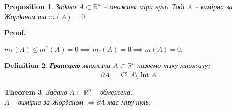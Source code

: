 \documentclass[a4paper, 10pt]{article}
\makeatletter
\def\qed{$\blacksquare$}
\theoremstyle{theoremdd}
\newtheorem{theorem}{Theorem}[subsection]
\theoremstyle{theoremdd}
\newtheorem{definition}[theorem]{Definition}
\theoremstyle{theoremdd}
\theoremstyle{theoremdd}
\theoremstyle{theoremdd}
\theoremstyle{theoremdd}
\theoremstyle{theoremdd}
\theoremstyle{theoremdd}
\theoremstyle{theoremdd}
\newtheorem{proposition}[theorem]{Proposition}
\theoremstyle{theoremdd}
\theoremstyle{theoremdd}
\theoremstyle{theoremdd}
\theoremstyle{theoremdd}
\theoremstyle{theoremdd}
\theoremstyle{theoremdd}
\renewenvironment{proof}[1][Proof.\\]{\par
\pushQED{\hfill \qed}%
\normalfont \topsep6\p@\@plus6\p@\relax
\trivlist
\item\relax
{\bfseries
#1\@addpunct{.}}\hspace\labelsep\ignorespaces
}{%
\popQED\endtrivlist\@endpefalse
}
\DeclareMathOperator{\Int}{Int}
\DeclareMathOperator{\Cl}{Cl}
\makeatother
\begin{document}
\begin{proposition}
Задано $A \subset \mathbb{R}^n$ -- множина міри нуль. Тоді $A$ -- вимірна за Жорданом та $m(A) = 0$.
\end{proposition}

\begin{proof}
$m_*(A) \leq m^*(A) = 0 \implies m_*(A) = 0 \implies m(A) = 0$.
\end{proof}

\begin{definition}
\textbf{Границею} множини $A \subset \mathbb{R}^n$ назвемо таку множину:
\begin{align*}
\partial A = \Cl A \setminus \Int A
\end{align*}
\end{definition}

\begin{theorem}
Задано $A \subset \mathbb{R}^n$ -- обмежена.\\
$A$ -- вимірна за Жорданом $\iff \partial A$ має міру нуль.
\end{theorem}
\end{document}
